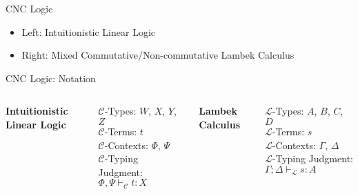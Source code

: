 \documentclass{beamer}
\begin{document}
\begin{frame}{CNC Logic}

\begin{itemize}
\item Left: Intuitionistic Linear Logic
\item Right: Mixed Commutative/Non-commutative Lambek Calculus
\end{itemize}

\begin{center}
\end{center}

\end{frame}

\begin{frame}{CNC Logic: Notation}

\begin{columns}
  \centerline{\textbf{Intuitionistic Linear Logic}}

  $\mathcal{C}$-Types: $W$, $X$, $Y$, $Z$ \\
  $\mathcal{C}$-Terms: $t$ \\
  $\mathcal{C}$-Contexts: $\Phi$, $\Psi$ \\
  $\mathcal{C}$-Typing Judgment: $\Phi,\Psi \vdash_\mathcal{C} t:X$

  \centerline{\textbf{Lambek Calculus}}

  $\mathcal{L}$-Types: $A$, $B$, $C$, $D$ \\
  $\mathcal{L}$-Terms: $s$ \\
  $\mathcal{L}$-Contexts: $\Gamma$, $\Delta$ \\
  $\mathcal{L}$-Typing Judgment: $\Gamma;\Delta \vdash_\mathcal{L} s:A$
\end{columns}

\end{frame}
\end{document}
